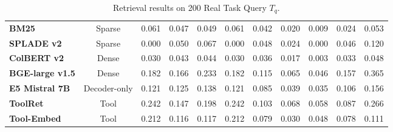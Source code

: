 \documentclass{article} %
\begin{document}
\begin{table}[H]
{\begin{tabular}{lcccccccccc}
\hline
\textbf{BM25} & Sparse & 0.061 & 0.047 & 0.049 & 0.061 & 0.042 & 0.020 & 0.009 & 0.024 & 0.053 \\
\textbf{SPLADE v2} & Sparse & 0.000 & 0.050 & 0.067 & 0.000 & 0.048 & 0.024 & 0.000 & 0.046 & 0.120 \\
\textbf{ColBERT v2} & Dense & 0.030 & 0.043 & 0.044 & 0.030 & 0.036 & 0.017 & 0.003 & 0.033 & 0.048 \\
\textbf{BGE-large v1.5} & Dense & 0.182 & 0.166 & 0.233 & 0.182 & 0.115 & 0.065 & 0.046 & 0.157 & 0.365 \\
\textbf{E5 Mistral 7B} & Decoder-only & 0.121 & 0.125 & 0.138 & 0.121 & 0.085 & 0.039 & 0.035 & 0.106 & 0.156 \\
\textbf{ToolRet} & Tool & 0.242 & 0.147 & 0.198 & 0.242 & 0.103 & 0.068 & 0.058 & 0.087 & 0.266 \\
\textbf{Tool-Embed} & Tool & 0.212 & 0.116 & 0.117 & 0.212 & 0.079 & 0.030 & 0.048 & 0.078 & 0.111 \\
\bottomrule
\end{tabular}%
}
\caption{Retrieval results on 200 Real Task Query $T_q$.}
\label{tab:realistic_performance}
\end{table}
\end{document}
